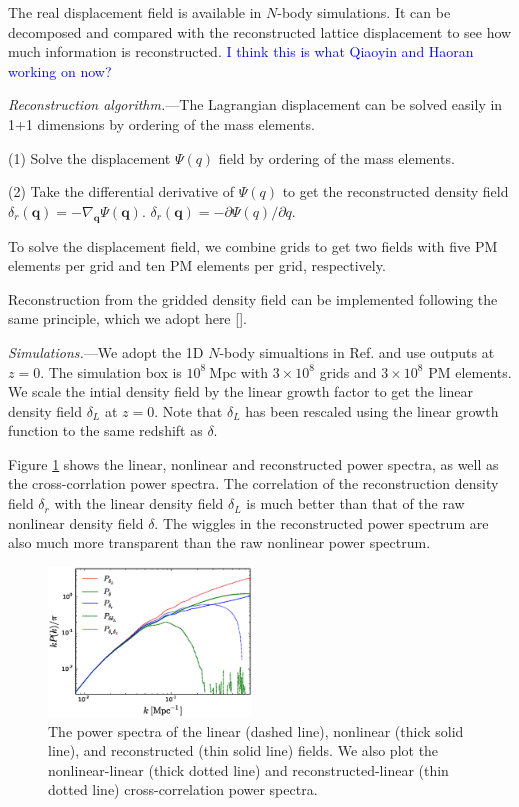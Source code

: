 \documentclass[aps,prd,twocolumn,showpacs,superscriptaddress,groupedaddress,nofootinbib]{revtex4}  %
\newcommand{\mr}{\mathrm}
\newcommand{\tcb}{\textcolor{blue}}
\begin{document}
The real displacement field is available in $N$-body simulations. It can be
decomposed and compared with the reconstructed lattice displacement to see
how much information is reconstructed. 
\tcb{I think this is what Qiaoyin and Haoran working on now?}


{\it Reconstruction algorithm.}---The Lagrangian displacement can be solved
easily in 1+1 dimensions by ordering of the mass elements.

(1) Solve the displacement $\Psi(q)$ field by ordering of the mass elements.

(2) Take the differential derivative of $\Psi(q)$ to get the reconstructed
density field $\delta_r(\bm{q})=-\nabla_{\bm{q}}\Psi(\bm{q})$.
$\delta_r(\bm{q})=-\partial\Psi(q)/\partial q$.

To solve the displacement field, we combine grids to get two fields with
five PM elements per grid and ten PM elements per grid, respectively.

Reconstruction from the gridded density field can be implemented following
the same principle, which we adopt here [].


{\it Simulations.}---We adopt the 1D $N$-body simualtions in 
Ref. \cite{2016matt}
and use outputs at $z=0$. The simulation box is $10^8\ \mr{Mpc}$ with 
$3\times10^8$ grids and $3\times10^8$ PM elements.
We scale the intial density field by the linear
growth factor to get the linear density field $\delta_L$ at $z=0$. 
Note that $\delta_L$ has been rescaled using the linear growth function
to the same redshift as $\delta$. 


Figure \ref{fig:ps} shows the linear, nonlinear and reconstructed power spectra,
as well as the cross-corrlation power spectra.
The correlation of the reconstruction density field $\delta_r$ with the linear
density field $\delta_L$ is much better than that of the raw nonlinear density 
field $\delta$. The wiggles in the reconstructed power spectrum are also much 
more transparent than the raw nonlinear power spectrum.

\begin{figure}[tbp]
\begin{center}
\includegraphics[width=0.48\textwidth]{f3x.eps}
\end{center}
\vspace{-0.7cm}
\caption{The power spectra of the linear (dashed line), nonlinear (thick solid
line), and reconstructed (thin solid line) fields. 
We also plot the nonlinear-linear (thick dotted line) and 
reconstructed-linear (thin dotted line) cross-correlation power spectra.}
\label{fig:ps}
\end{figure}
\end{document}
